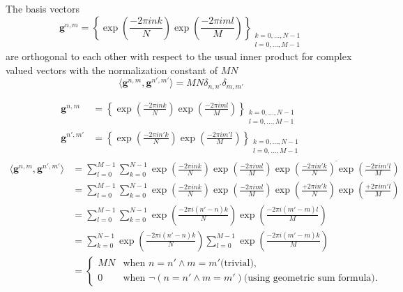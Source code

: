 \begin{Prop}\label{Prop:2ddftbasisvectors}
    The basis vectors
    \begin{equation}\label{eq:2ddftbasisvectors}
        \boldsymbol{g}^{n,m} = \left\{\exp\left({\frac{-2\pi ink}{N}}\right)\exp\left({\frac{-2\pi iml}{M}}\right)\right\}_{\substack{k=0,\ldots,N-1\\l=0,\ldots,M-1}}
    \end{equation}
    are orthogonal to each other with respect to the usual inner product for complex valued vectors 
    with the normalization constant of $MN$
    \begin{equation}
        \langle\boldsymbol{g}^{n,m},\boldsymbol{g}^{n',m'}\rangle= MN \delta_{n,n'}\delta_{m,m'}
    \end{equation}
\end{Prop}

\begin{Proof}
    \begin{align} 
        \boldsymbol{g}^{n,m}    &= \left\{\exp\left({\frac{-2\pi ink}{N}}\right)\exp\left({\frac{-2\pi iml}{M}}\right)\right\}_{\substack{k=0,\ldots,N-1\\l=0,\ldots,M-1}}\\
        \boldsymbol{g}^{n',m'}  &= \left\{\exp\left({\frac{-2\pi in'k}{N}}\right)\exp\left({\frac{-2\pi im'l}{M}}\right)\right\}_{\substack{k=0,\ldots,N-1\\l=0,\ldots,M-1}}
    \end{align}
    \begin{equation}
        \begin{split}  
            \langle\boldsymbol{g}^{n,m},\boldsymbol{g}^{n',m'}\rangle &= \sum_{l=0}^{M-1}\sum_{k=0}^{N-1} \exp\left({\frac{-2\pi ink}{N}}\right)\exp\left({\frac{-2\pi iml}{M}}\right)\overline{\exp\left({\frac{-2\pi in'k}{N}}\right)\exp\left({\frac{-2\pi im'l}{M}}\right)}\\
            &= \sum_{l=0}^{M-1}\sum_{k=0}^{N-1} \exp\left({\frac{-2\pi ink}{N}}\right)\exp\left({\frac{-2\pi iml}{M}}\right)\exp\left({\frac{+2\pi in'k}{N}}\right)\exp\left({\frac{+2\pi im'l}{M}}\right)\\
            &= \sum_{l=0}^{M-1}\sum_{k=0}^{N-1} \exp\left({\frac{-2\pi i(n'-n)k}{N}}\right)\exp\left({\frac{-2\pi i(m'-m)l}{M}}\right)\\
            &= \sum_{k=0}^{N-1} \exp\left({\frac{-2\pi i(n'-n)k}{N}}\right)\sum_{l=0}^{M-1} \exp\left({\frac{-2\pi i(m'-m)k}{M}}\right)\\
            &= 
            \begin{cases}
                MN & \text{when $n = n' \wedge m=m'$}\text{(trivial)},\\
                0 & \text{when $\neg(n = n' \wedge m=m')$}\text{(using geometric sum formula)}.
            \end{cases}    
        \end{split}
    \end{equation}
\end{Proof}


